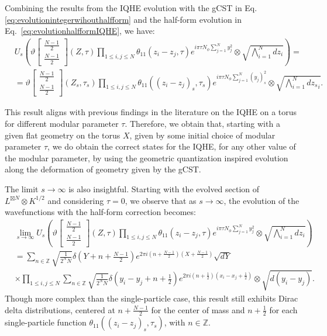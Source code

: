 \documentclass[a4paper,11pt]{article}
\begin{document}
Combining the results from the IQHE evolution with the gCST in Eq.\eqref{eq:evolutionintegerwihouthalfform} and the half-form evolution in Eq.~\eqref{eq:evolutionhalfformIQHE}, we have:
\begin{align*}
&U_{s}\left(\vartheta\begin{bmatrix}
\frac{N-1}{2}\\
\frac{N-1}{2}
\end{bmatrix}(Z,\tau)\prod_{1\leq i,j\leq N}\theta_{11}(z_{i}-z_{j},\tau)e^{i\pi\tau N_{\phi}\sum_{j=1}^{N}y_{j}^{2}}\otimes \sqrt{\bigwedge_{i=1}^{N} dz_{i}}\right) =\\
&=\vartheta\begin{bmatrix}
\frac{N-1}{2}\\
\frac{N-1}{2}
\end{bmatrix}(Z_{s},\tau_{s})\prod_{1\leq i,j\leq N}\theta_{11}((z_{i}-z_{j})_{s},\tau_s)e^{i\pi\tau N_{\phi}\sum_{j=1}^{N}(y_{j})_{s}^{2}} \otimes \sqrt{\bigwedge_{i=1}^{N}d{z_s}_{i}}.     
\end{align*}

This result aligns with previous findings in the literature on the IQHE on a torus for different modular parameter $\tau$. Therefore, we obtain that, starting with a given flat geometry on the torus $X$, given by some initial choice of modular parameter $\tau$, we do obtain the correct states for the IQHE, for any other value of the modular parameter, by using the geometric quantization inspired evolution along the deformation of geometry given by the gCST. 

The limit $s\rightarrow \infty$ is also insightful. Starting with the evolved section of $L^{\boxtimes N}\otimes K^{1/2}$ and considering $\tau = 0$, we observe that as $s\rightarrow \infty$, the evolution of the wavefunctions with the half-form correction becomes:
\begin{align*}
&\lim_{s\rightarrow \infty} U_{s}\left(\vartheta\begin{bmatrix}
\frac{N-1}{2}\\
\frac{N-1}{2}
\end{bmatrix}(Z,\tau)\prod_{1\leq i,j\leq N}\theta_{11}(z_{i}-z_{j},\tau)e^{i\pi\tau N_{\phi}\sum_{j=1}^{N}y_{j}^{2}}\otimes \sqrt{\bigwedge_{i=1}^{N} dz_{i}}\right) \\
&=\sum_{n\in\mathbb{Z}}\sqrt{\frac{1}{2^{N}N}}\delta\left(Y+n+\frac{N-1}{2}\right)e^{2\pi i\left(n+\frac{N-1}{2}\right)\left(X+\frac{N-1}{2}\right)}\sqrt{dY} \\
&\times \prod_{1\leq i,j\leq N}\sum_{n\in\mathbb{Z}}\sqrt{\frac{1}{2^{N}N}}\delta\left(y_{i}-y_{j}+n+\frac{1}{2}\right)e^{2\pi i\left(n+\frac{1}{2}\right)\left(x_{i}-x_{j}+\frac{1}{2}\right)}\otimes \sqrt{d(y_{i}-y_{j})}. 
\end{align*}
Though more complex than the single-particle case, this result still exhibits Dirac delta distributions, centered at $n+\frac{N-1}{2}$ for the center of mass and $n+\frac{1}{2}$ for each single-particle function $\theta_{11}((z_{i}-z_{j})_{s},\tau_s)$, with $n\in\mathbb{Z}$. 
\end{document}
